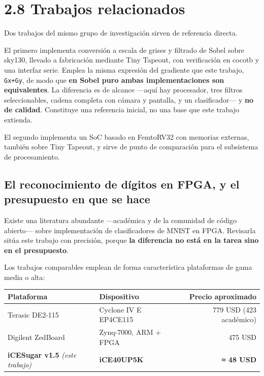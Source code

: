 \section{2.8 Trabajos relacionados}\label{trabajos-relacionados}

Dos trabajos del mismo grupo de investigación sirven de referencia
directa.

El primero implementa conversión a escala de grises y filtrado de Sobel
sobre sky130, llevado a fabricación mediante Tiny Tapeout, con
verificación en cocotb y una interfaz serie. Emplea la misma expresión
del gradiente que este trabajo,
\texttt{\textbar{}Gx\textbar{}+\textbar{}Gy\textbar{}}, de modo que
\textbf{en Sobel puro ambas implementaciones son equivalentes}. La
diferencia es de alcance ---aquí hay procesador, tres filtros
seleccionables, cadena completa con cámara y pantalla, y un
clasificador--- y \textbf{no de calidad}. Constituye una referencia
inicial, no una base que este trabajo extienda.

El segundo implementa un SoC basado en FemtoRV32 con memorias externas,
también sobre Tiny Tapeout, y sirve de punto de comparación para el
subsistema de procesamiento.

\subsection{El reconocimiento de dígitos en FPGA, y el presupuesto en
que se
hace}\label{el-reconocimiento-de-duxedgitos-en-fpga-y-el-presupuesto-en-que-se-hace}

Existe una literatura abundante ---académica y de la comunidad de código
abierto--- sobre implementación de clasificadores de MNIST en FPGA.
Revisarla sitúa este trabajo con precisión, porque \textbf{la diferencia
no está en la tarea sino en el presupuesto}.

Los trabajos comparables emplean de forma característica plataformas de
gama media o alta:

\begin{longtable}[]{@{}llr@{}}
\toprule\noalign{}
Plataforma & Dispositivo & Precio aproximado \\
\midrule\noalign{}
\endhead
\bottomrule\noalign{}
\endlastfoot
Terasic DE2-115 & Cyclone IV E EP4CE115 & 779 USD (423 académico) \\
Digilent ZedBoard & Zynq-7000, ARM + FPGA & 475 USD \\
\textbf{iCESugar v1.5} \emph{(este trabajo)} & \textbf{iCE40UP5K} &
\textbf{≈ 48 USD} \\
\end{longtable}

